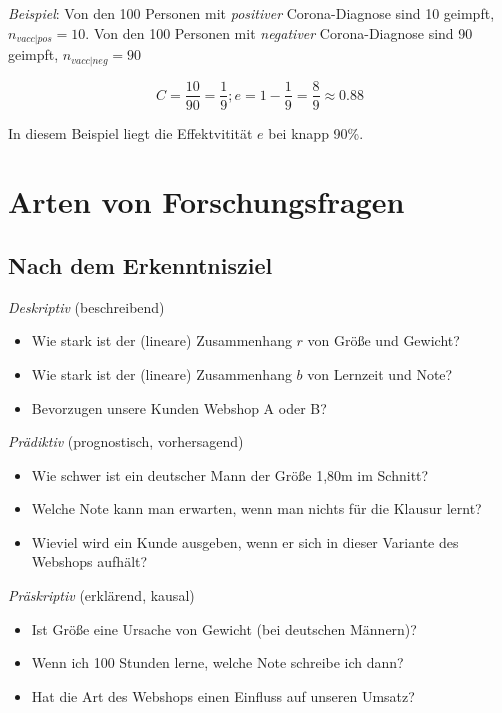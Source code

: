 \documentclass[
  a4paper,
  DIV=11]{scrreprt}
\providecommand{\tightlist}{%
  \setlength{\itemsep}{0pt}\setlength{\parskip}{0pt}}\usepackage{longtable,booktabs,array}
\theoremstyle{definition}
\theoremstyle{remark}
\begin{document}
\emph{Beispiel}: Von den 100 Personen mit \emph{positiver}
Corona-Diagnose sind 10 geimpft, \(n_{vacc|pos}=10\). Von den 100
Personen mit \emph{negativer} Corona-Diagnose sind 90 geimpft,
\(n_{vacc|neg}=90\)

\[C= \frac{10}{90} = \frac{1}{9}; e = 1 - \frac{1}{9} = \frac{8}{9} \approx 0.88\]

In diesem Beispiel liegt die Effektvitität \(e\) bei knapp 90\%.

\hypertarget{arten-von-forschungsfragen}{%
\section{Arten von Forschungsfragen}\label{arten-von-forschungsfragen}}

\hypertarget{nach-dem-erkenntnisziel}{%
\subsection{Nach dem Erkenntnisziel}\label{nach-dem-erkenntnisziel}}

\emph{Deskriptiv} (beschreibend)

\begin{itemize}
\tightlist
\item
  Wie stark ist der (lineare) Zusammenhang \(r\) von Größe und Gewicht?
\item
  Wie stark ist der (lineare) Zusammenhang \(b\) von Lernzeit und Note?
\item
  Bevorzugen unsere Kunden Webshop A oder B?
\end{itemize}

\emph{Prädiktiv} (prognostisch, vorhersagend)

\begin{itemize}
\tightlist
\item
  Wie schwer ist ein deutscher Mann der Größe 1,80m im Schnitt?
\item
  Welche Note kann man erwarten, wenn man nichts für die Klausur lernt?
\item
  Wieviel wird ein Kunde ausgeben, wenn er sich in dieser Variante des
  Webshops aufhält?
\end{itemize}

\emph{Präskriptiv} (erklärend, kausal)

\begin{itemize}
\tightlist
\item
  Ist Größe eine Ursache von Gewicht (bei deutschen Männern)?
\item
  Wenn ich 100 Stunden lerne, welche Note schreibe ich dann?
\item
  Hat die Art des Webshops einen Einfluss auf unseren Umsatz?
\end{itemize}
\end{document}

